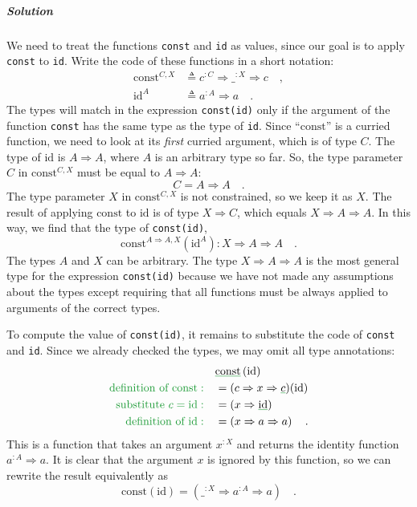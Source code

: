 \subparagraph{Solution}

We need to treat the functions \lstinline!const! and \lstinline!id!
as values, since our goal is to apply \lstinline!const! to \lstinline!id!.
Write the code of these functions in a short notation:
\begin{align*}
\text{const}^{C,X} & \triangleq c^{:C}\Rightarrow\_^{:X}\Rightarrow c\quad,\\
\text{id}^{A} & \triangleq a^{:A}\Rightarrow a\quad.
\end{align*}
The types will match in the expression \lstinline!const(id)! only
if the argument of the function \lstinline!const! has the same type
as the type of \lstinline!id!. Since ``$\text{const}$'' is a curried
function, we need to look at its \emph{first} curried argument, which
is of type $C$. The type of $\text{id}$ is $A\Rightarrow A$, where
$A$ is an arbitrary type so far. So, the type parameter $C$ in $\text{const}^{C,X}$
must be equal to $A\Rightarrow A$:
\[
C=A\Rightarrow A\quad.
\]
 The type parameter $X$ in $\text{const}^{C,X}$ is not constrained,
so we keep it as $X$. The result of applying $\text{const}$ to $\text{id}$
is of type $X\Rightarrow C$, which equals $X\Rightarrow A\Rightarrow A$.
In this way, we find that the type of \lstinline!const(id)!,
\[
\text{const}^{A\Rightarrow A,X}(\text{id}^{A}):X\Rightarrow A\Rightarrow A\quad.
\]
The types $A$ and $X$ can be arbitrary. The type $X\Rightarrow A\Rightarrow A$
is the most general type for the expression \lstinline!const(id)!
because we have not made any assumptions about the types except requiring
that all functions must be always applied to arguments of the correct
types.

To compute the value of \lstinline!const(id)!, it remains to substitute
the code of \lstinline!const! and \lstinline!id!. Since we already
checked the types, we may omit all type annotations:
\begin{align*}
 & \gunderline{\text{const}}\left(\text{id}\right)\\
{\color{greenunder}\text{definition of const}:}\quad & =(c\Rightarrow x\Rightarrow\gunderline c)(\text{id})\\
{\color{greenunder}\text{substitute }c=\text{id}:}\quad & =(x\Rightarrow\gunderline{\text{id}})\\
{\color{greenunder}\text{definition of }\text{id}:}\quad & =\left(x\Rightarrow a\Rightarrow a\right)\quad.
\end{align*}
This is a function that takes an argument $x^{:X}$ and returns the
identity function $a^{:A}\Rightarrow a$. It is clear that the argument
$x$ is ignored by this function, so we can rewrite the result equivalently
as
\[
\text{const}(\text{id})=(\_^{:X}\Rightarrow a^{:A}\Rightarrow a)\quad.
\]


